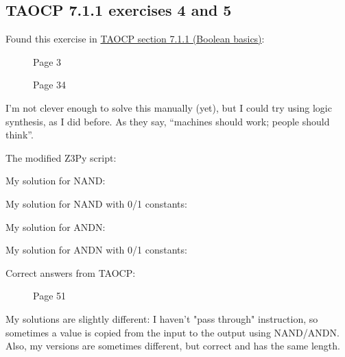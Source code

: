 \subsection{TAOCP 7.1.1 exercises 4 and 5}

\renewcommand{\CURPATH}{synth/logic/TAOCP_711_4_and_5}

Found this exercise in \href{http://www.cs.utsa.edu/~wagner/knuth/fasc0b.pdf}{TAOCP section 7.1.1 (Boolean basics)}:

\begin{figure}[H]
\centering
{}
\caption{Page 3}
\end{figure}

\begin{figure}[H]
\centering
{}
\caption{Page 34}
\end{figure}

I'm not clever enough to solve this manually (yet),
but I could try using logic synthesis, as I did before.
As they say, ``machines should work; people should think''.

The modified Z3Py script:



My solution for NAND:



My solution for NAND with 0/1 constants:



My solution for ANDN:



My solution for ANDN with 0/1 constants:



Correct answers from \ac{TAOCP}:

\begin{figure}[H]
\centering
{}
\caption{Page 51}
\end{figure}

My solutions are slightly different: I haven't "pass through" instruction, so sometimes a value is copied from the input to the output using NAND/ANDN.
Also, my versions are sometimes different, but correct and has the same length.

